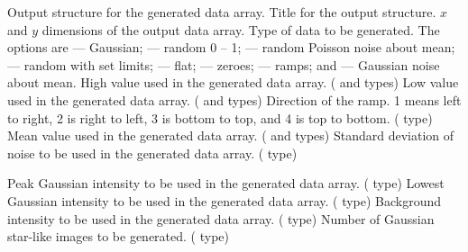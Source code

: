 {\begin{manroutinedescription}
\begin{manparametertable}
  Output {} structure for the generated data array.
  Title for the output {} structure. \mbox{}
  {$x$} and {$y$} dimensions of the output data array.
  Type of data to be generated. The options are {} --- Gaussian;
  {} --- random 0 -- 1; {} --- random Poisson noise
  about mean; {} --- random with set limits;
  {} --- flat;   {} --- zeroes;
  {} --- ramps; and {} --- Gaussian noise about mean.
  High value used in the generated data array.
   ({} and {} types)
  Low value used in the generated data array.
   ({} and {} types)
  Direction of the ramp. 1 means left to right, 2 is right to
  left, 3 is bottom to top, and 4 is top to bottom.
  ({} type)
  Mean value used in the generated data array.
  ({} and {} types)
  Standard deviation of noise to be used in the generated data
  array. ({} type)
\end{manparametertable}
\begin{manparametertable}
  Peak Gaussian intensity to be used in the generated data array.
 ({} type)
  Lowest Gaussian intensity to be used in the generated data array.
 ({} type)
  Background intensity to be used in the generated data array.
 ({} type)
  Number of Gaussian star-like images to be generated. ({} type)

\end{manparametertable}
\end{manroutinedescription}}
